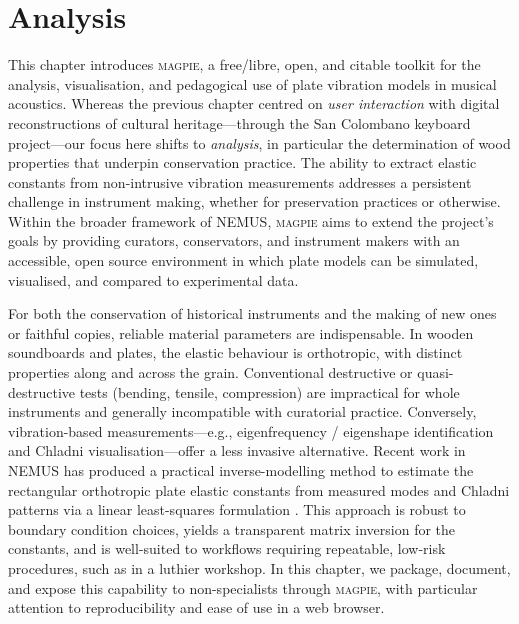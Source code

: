 \chapter{Analysis}\label{ch:analysis}

This chapter introduces \textsc{magpie}, a free/libre, open, and citable toolkit for the analysis, visualisation, and pedagogical use of plate vibration models in musical acoustics. Whereas the previous chapter centred on \emph{user interaction} with digital reconstructions of cultural heritage—through the San Colombano keyboard project—our focus here shifts to \emph{analysis}, in particular the determination of wood properties that underpin conservation practice. The ability to extract elastic constants from non-intrusive vibration measurements addresses a persistent challenge in instrument making, whether for preservation practices or otherwise. Within the broader framework of \textsc{NEMUS}, \textsc{magpie} aims to extend the project’s goals by providing curators, conservators, and instrument makers with an accessible, open source environment in which plate models can be simulated, visualised, and compared to experimental data.


For both the conservation of historical instruments and the making of new ones or faithful copies, reliable material parameters are indispensable. In wooden soundboards and plates, the elastic behaviour is orthotropic, with distinct properties along and across the grain. Conventional destructive or quasi-destructive tests (bending, tensile, compression) are impractical for whole instruments and generally incompatible with curatorial practice. Conversely, vibration-based measurements—e.g., eigenfrequency / eigenshape identification and Chladni visualisation—offer a less invasive alternative. Recent work in \textsc{NEMUS} has produced a practical inverse-modelling method to estimate the rectangular orthotropic plate elastic constants from measured modes and Chladni patterns via a linear least-squares formulation \cite{ducceschi_method_2024,ducceschi_open_2024}. This approach is robust to boundary condition choices, yields a transparent matrix inversion for the constants, and is well-suited to workflows requiring repeatable, low-risk procedures, such as in a luthier workshop. In this chapter, we package, document, and expose this capability to non-specialists through \textsc{magpie}, with particular attention to reproducibility and ease of use in a web browser.



